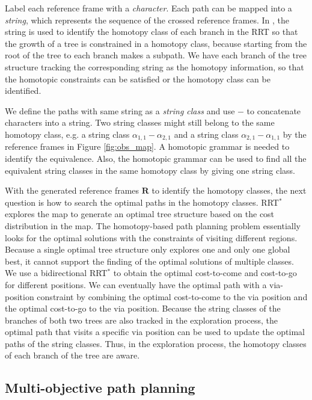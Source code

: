 \documentclass[phd]{byuprop}
\begin{document}
Label each reference frame with a \emph{character}.
Each path can be mapped into a {\em string}, which represents the sequence of the crossed reference frames.
In \cite{Hernandez2015}, the string is used to identify the homotopy class of each branch in the RRT so that the growth of a tree is constrained in a homotopy class, because starting from the root of the tree to each branch makes a subpath.
We have each branch of the tree structure tracking the corresponding string as the homotopy information, so that the homotopic constraints can be satisfied or the homotopy class can be identified.

We define the paths with same string as a \emph{string class} and use $ - $ to concatenate characters into a string.
Two string classes might still belong to the same homotopy class, e.g. a string class $ \alpha_{1,1}-\alpha_{2,1} $ and a string class $ \alpha_{2,1}-\alpha_{1,1} $ by the reference frames in Figure \ref{fig:obs_map}.
A homotopic grammar is needed to identify the equivalence.
Also, the homotopic grammar can be used to find all the equivalent string classes in the same homotopy class by giving one string class.

With the generated reference frames $ \mathbf{R} $ to identify the homotopy classes, the next question is how to search the optimal paths in the homotopy classes.
RRT$^{*}$ explores the map to generate an optimal tree structure based on the cost distribution in the map.
The homotopy-based path planning problem essentially looks for the optimal solutions with the constraints of visiting different regions.
Because a single optimal tree structure only explores one and only one global best, it cannot support the finding of the optimal solutions of multiple classes.
We use a bidirectional RRT$^{*}$ to obtain the optimal cost-to-come and cost-to-go for different positions.
We can eventually have the optimal path with a via-position constraint by combining the optimal cost-to-come to the via position and the optimal cost-to-go to the via position.
Because the string classes of the branches of both two trees are also tracked in the exploration process, the optimal path that visits a specific via position can be used to update the optimal paths of the string classes. 
Thus, in the exploration process, the homotopy classes of each branch of the tree are aware.

\subsection{Multi-objective path planning}
\end{document}
